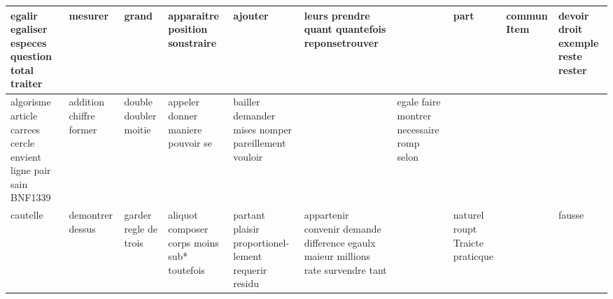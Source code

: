 \documentclass[a4paper,10pt]{article}
\begin{document}
{\begin{tabular}{|p{1.9cm}|p{1.9cm}|p{1.9cm}|p{1.9cm}|p{1.9cm}|p{1.9cm}|p{1.9cm}|p{1.9cm}|p{1.9cm}|p{1.9cm}|}
\hline
egalir egaliser especes question total traiter & mesurer & grand & apparaitre \textcolor{gris}{position} \textcolor{gris}{soustraire} & \textcolor{gris}{ajouter} & leurs prendre quant quantefois repon\textcolor{gris}{se}trouver & & \textcolor{gris}{part} & commun Item & devoir \textcolor{gris}{droit} \textcolor{gris}{exemple} reste rester\\
\hline
algorisme article carrees cercle envient ligne pair sain BNF1339 & addition chiffre former & \textcolor{gris}{double} \textcolor{gris}{doubler} moitie & appeler \textcolor{gris}{donner} \textcolor{gris}{maniere} \textcolor{gris}{pouvoir} \textcolor{gris}{se}& bailler demander mises nomper pareillement vouloir & & egale faire montrer necessaire romp selon & & & \\
\hline
cautelle & demontrer dessus & \textcolor{gris}{garder} \textcolor{gris}{regle} \textcolor{gris}{de} \textcolor{gris}{trois} & aliquot composer corps moins sub* toutefois & partant plaisir proportionel- lement requerir residu & appartenir convenir demande difference egaulx maieur millions rate survendre tant & & naturel roupt Traicte praticque & & fausse\\
\hline
\end{tabular}
}

\end{document}
